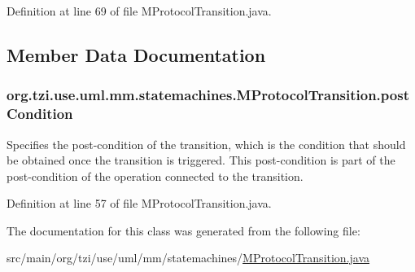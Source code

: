 Definition at line 69 of file M\-Protocol\-Transition.\-java.



\subsection{Member Data Documentation}
\hypertarget{classorg_1_1tzi_1_1use_1_1uml_1_1mm_1_1statemachines_1_1_m_protocol_transition_a12977e947ecdba7ff8881e4f61904b0d}{
\subsubsection[{post\-Condition}]{ org.\-tzi.\-use.\-uml.\-mm.\-statemachines.\-M\-Protocol\-Transition.\-post\-Condition\hspace{0.3cm}{\ttfamily [protected]}}}\label{classorg_1_1tzi_1_1use_1_1uml_1_1mm_1_1statemachines_1_1_m_protocol_transition_a12977e947ecdba7ff8881e4f61904b0d}
Specifies the post-\/condition of the transition, which is the condition that should be obtained once the transition is triggered. This post-\/condition is part of the post-\/condition of the operation connected to the transition. 

Definition at line 57 of file M\-Protocol\-Transition.\-java.



The documentation for this class was generated from the following file\-:\begin{DoxyCompactItemize}
\item 
src/main/org/tzi/use/uml/mm/statemachines/\hyperlink{_m_protocol_transition_8java}{M\-Protocol\-Transition.\-java}\end{DoxyCompactItemize}
